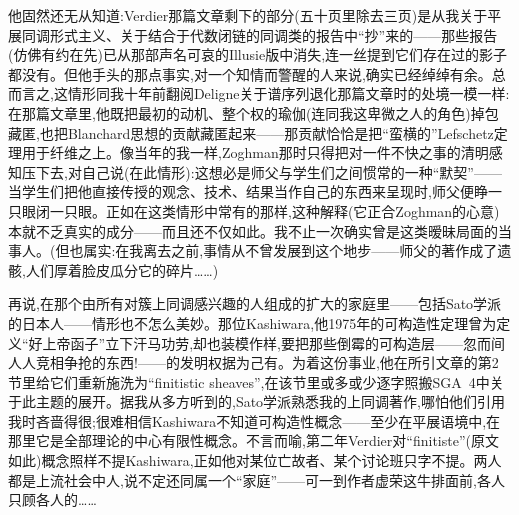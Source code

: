 \noindent 他固然还无从知道:Verdier那篇文章剩下的部分(五十页里除去三页)是从我关于平展同调形式主义、关于结合于代数闭链的同调类的报告中“抄”来的——那些报告(仿佛有约在先)已从那部声名可哀的Illusie版中消失,连一丝提到它们存在过的影子都没有。但他手头的那点事实,对一个知情而警醒的人来说,确实已经绰绰有余。总而言之,这情形同我十年前翻阅Deligne关于谱序列退化那篇文章时的处境一模一样:在那篇文章里,他既把最初的动机、整个权的瑜伽(连同我这卑微之人的角色)掉包藏匿,也把Blanchard思想的贡献藏匿起来——那贡献恰恰是把“蛮横的”Lefschetz定理用于纤维之上。像当年的我一样,Zoghman那时只得把对一件不快之事的清明感知压下去,对自己说(在此情形):这想必是师父与学生们之间惯常的一种“默契”——当学生们把他直接传授的观念、技术、结果当作自己的东西来呈现时,师父便睁一只眼闭一只眼。正如在\dmark{}这类情形中常有的那样,这种解释(它正合Zoghman的心意)本就不乏真实的成分——而且还不仅如此。我不止一次确实曾是这类暧昧局面的当事人。(但也属实:在我离去之前,事情从不曾发展到这个地步——师父的著作成了遗骸,人们厚着脸皮瓜分它的碎片……)

\noindent 再说,在那个由所有对簇上同调感兴趣的人组成的扩大的家庭里——包括Sato学派的日本人——情形也不怎么美妙。那位Kashiwara,他1975年的可构造性定理曾为定义“好上帝函子”立下汗马功劳,却也装模作样,要把那些倒霉的可构造层——忽而间人人竞相争抢的东西!——的发明权据为己有。为着这份事业,他在所引文章的第2节里给它们重新施洗为“finitistic sheaves”,在该节里或多或少逐字照搬SGA~4中关于此主题的展开。据我从多方听到的,Sato学派熟悉我的上同调著作,哪怕他们引用我时吝啬得很;很难相信Kashiwara不知道可构造性概念——至少在平展语境中,在那里它是全部理论的中心有限性概念。不言而喻,第二年Verdier对“finitiste”(原文如此)概念照样不提Kashiwara,正如他对某位亡故者、某个讨论班只字不提。两人都是上流社会中人,说不定还同属一个“家庭”——可一到作者虚荣这牛排面前,各人只顾各人的……

